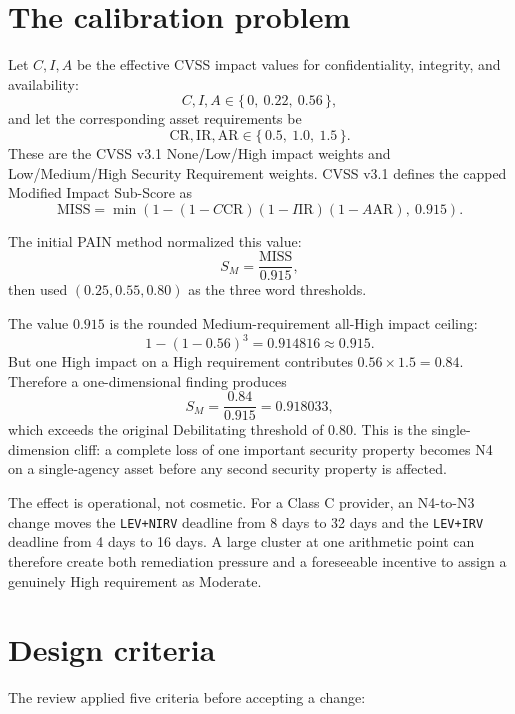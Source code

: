 \documentclass[11pt]{article}
\newcommand{\code}[1]{\texttt{#1}}
\begin{document}
\section{The calibration problem}
\label{sec:problem}

Let $C,I,A$ be the effective CVSS impact values for confidentiality, integrity,
and availability:
\[
C,I,A \in \{\,0,\ 0.22,\ 0.56\,\},
\]
and let the corresponding asset requirements be
\[
\mathrm{CR},\mathrm{IR},\mathrm{AR}
\in \{\,0.5,\ 1.0,\ 1.5\,\}.
\]
These are the CVSS v3.1 None/Low/High impact weights and Low/Medium/High Security
Requirement weights. CVSS v3.1 defines the capped Modified Impact Sub-Score as
\begin{equation}
\mathrm{MISS}=\min\!\left(
1-(1-C\mathrm{CR})(1-I\mathrm{IR})(1-A\mathrm{AR}),\ 0.915
\right).
\label{eq:miss}
\end{equation}

The initial PAIN method normalized this value:
\begin{equation}
S_M=\frac{\mathrm{MISS}}{0.915},
\label{eq:oldscore}
\end{equation}
then used $(0.25,0.55,0.80)$ as the three word thresholds.

The value $0.915$ is the rounded Medium-requirement all-High impact ceiling:
\[
1-(1-0.56)^3=0.914816\approx0.915.
\]
But one High impact on a High requirement contributes $0.56\times1.5=0.84$.
Therefore a one-dimensional finding produces
\[
S_M=\frac{0.84}{0.915}=0.918033,
\]
which exceeds the original Debilitating threshold of $0.80$. This is the
single-dimension cliff: a complete loss of one important security property becomes
N4 on a single-agency asset before any second security property is affected.

The effect is operational, not cosmetic. For a Class C provider, an N4-to-N3
change moves the \code{LEV+NIRV} deadline from 8 days to 32 days and the
\code{LEV+IRV} deadline from 4 days to 16 days. A large cluster at one arithmetic
point can therefore create both remediation pressure and a foreseeable incentive
to assign a genuinely High requirement as Moderate.

\section{Design criteria}

The review applied five criteria before accepting a change:
\end{document}
